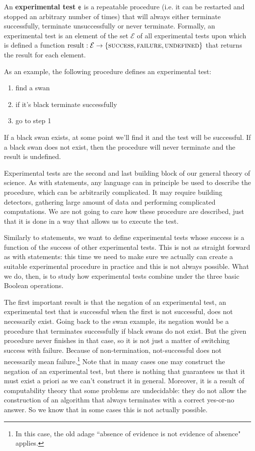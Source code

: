 \documentclass[11pt,letterpaper,fleqn]{memoir} %
\begin{document}
\begin{mathSection}
\begin{defn}\label{def_experimental_tests}
	An \textbf{experimental test} $\mathsf{e}$ is a repeatable procedure (i.e. it can be restarted and stopped an arbitrary number of times) that will always either terminate successfully, terminate unsuccessfully or never terminate. Formally, an experimental test is an element of the set $\mathcal{E}$ of all experimental tests upon which is defined a function $\operatorname{result}: \mathcal{E} \to \{\textsc{success}, \textsc{failure}, \textsc{undefined}\}$ that returns the result for each element.
\end{defn}
\end{mathSection}

As an example, the following procedure defines an experimental test:
\begin{enumerate}
	\item find a swan
	\item if it's black terminate successfully
	\item go to step 1
\end{enumerate}
If a black swan exists, at some point we'll find it and the test will be successful. If a black swan does not exist, then the procedure will never terminate and the result is undefined.

Experimental tests are the second and last building block of our general theory of science. As with statements, any language can in principle be used to describe the procedure, which can be arbitrarily complicated. It may require building detectors, gathering large amount of data and performing complicated computations. We are not going to care how these procedure are described, just that it is done in a way that allows us to execute the test.

Similarly to statements, we want to define experimental tests whose success is a function of the success of other experimental tests. This is not as straight forward as with statements: this time we need to make sure we actually can create a suitable experimental procedure in practice and this is not always possible. What we do, then, is to study how experimental tests combine under the three basic Boolean operations.

The first important result is that the negation of an experimental test, an experimental test that is successful when the first is not successful, does not necessarily exist. Going back to the swan example, its negation would be a procedure that terminates successfully if black swans do not exist. But the given procedure never finishes in that case, so it is not just a matter of switching success with failure. Because of non-termination, not-successful does not necessarily mean failure.\footnote{In this case, the old adage ``absence of evidence is not evidence of absence" applies.} Note that in many cases one may construct the negation of an experimental test, but there is nothing that guarantees us that it must exist a priori as we can't construct it in general. Moreover, it is a result of computability theory that some problems are undecidable: they do not allow the construction of an algorithm that always terminates with a correct yes-or-no answer. So we know that in some cases this is not actually possible.
\end{document}
